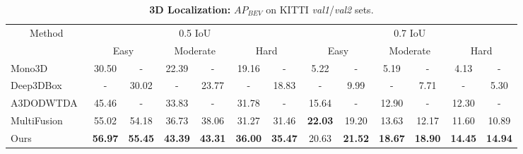 \documentclass[10pt,twocolumn,letterpaper]{article}
\begin{document}
	\begin{table*}[t!]
		\small
		\centering
		\begin{tabular}{|l||c@{~/~}cc@{~/~}cc@{~/~}c||c@{~/~}cc@{~/~}cc@{~/~}c|}
			\hline
			\multicolumn{1}{|c||}{Method} & \multicolumn{6}{c||}{0.5 IoU} & \multicolumn{6}{c|}{0.7 IoU} \\
			\cline{2-13} &
			\multicolumn{2}{c}{Easy} & \multicolumn{2}{c}{Moderate} & \multicolumn{2}{c||}{Hard} &
			\multicolumn{2}{c}{Easy} & \multicolumn{2}{c}{Moderate} & \multicolumn{2}{c|}{Hard} \\ \hline
			Mono3D~\cite{chen_mono3d}   & 30.50 &   -   & 22.39 &   -   & 19.16 &   -   &  5.22 &   -   &  5.19 &   -   &  4.13 &   -   \\
			Deep3DBox~\cite{mousavian_deep3dbox}  &   -   & 30.02 &   -   & 23.77 &   -   & 18.83 &   -   &  9.99 &   -   &  7.71 &   -   &  5.30 \\ 
			A3DODWTDA~\cite{lindernoren}        & 45.46 &   -   & 33.83 &   -   & 31.78 &   -   & 15.64 &   -   & 12.90 &   -   & 12.30 &   -   \\
			MultiFusion~\cite{xu_multifusion} & 55.02 & 54.18 & 36.73 & 38.06 & 31.27 & 31.46 & \textbf{22.03} & 19.20 & 13.63 & 12.17 & 11.60 & 10.89 \\
			\hline
			Ours        & \textbf{56.97} & \textbf{55.45} & \textbf{43.39} & \textbf{43.31} & \textbf{36.00} & \textbf{35.47} &
			20.63  & \textbf{21.52} & \textbf{18.67} & \textbf{18.90} & \textbf{14.45} & \textbf{14.94} \\
			\hline
		\end{tabular}
		\caption{\textbf{3D Localization:} \emph{$AP_{BEV}$} on KITTI \emph{val1}/\emph{val2} sets.}
		\label{tab:kitti_val_bev}
	\end{table*}
	
\end{document}
